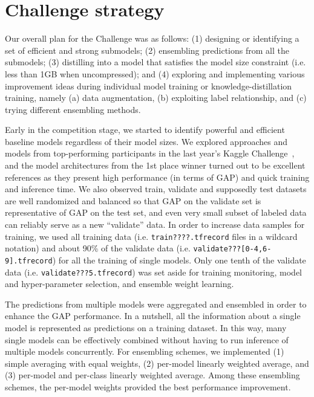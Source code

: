 \documentclass[runningheads]{llncs}
\begin{document}
\section{Challenge strategy} \label{sec:strategy}
Our overall plan for the Challenge was as follows:
(1) designing or identifying a set of efficient and strong submodels;
(2) ensembling predictions from all the submodels;
(3) distilling into a model that satisfies the model size constraint (i.e. less than 1GB when uncompressed); and
(4) exploring and implementing various improvement ideas during individual model training or knowledge-distillation training, namely (a) data augmentation, (b) exploiting label relationship, and (c) trying different ensembling methods.

Early in the competition stage, we started to identify powerful and efficient baseline models regardless of their model sizes.
We explored approaches and models from top-performing participants in the last year's Kaggle Challenge~\cite{kaggle2017}, and the model architectures from the 1st place winner \cite{miech2017} turned out to be excellent references as they present high performance (in terms of GAP) and quick training and inference time.
We also observed train, validate and supposedly test datasets are well randomized and balanced so that GAP on the validate set is representative of GAP on the test set, and even very small subset of labeled data can reliably serve as a new ``validate'' data.
In order to increase data samples for training, we used all training data (i.e. \texttt{train????.tfrecord} files in a wildcard notation) and about 90\% of the validate data (i.e. \texttt{validate???[0-4,6-9].tfrecord}) for all the training of single models.
Only one tenth of the validate data (i.e. \texttt{validate???5.tfrecord}) was set aside for training monitoring, model and hyper-parameter selection, and ensemble weight learning.

The predictions from multiple models were aggregated and ensembled in order to enhance the GAP performance.
In a nutshell, all the information about a single model is represented as predictions on a training dataset.
In this way, many single models can be effectively combined without having to run inference of multiple models concurrently.
For ensembling schemes, we implemented (1) simple averaging with equal weights, (2) per-model linearly weighted average, and (3) per-model and per-class linearly weighted average.
Among these ensembling schemes, the per-model weights provided the best performance improvement.
\end{document}
